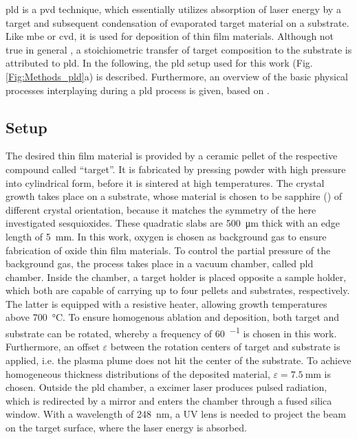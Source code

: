 \gls{pld} is a \gls{pvd} technique, which essentially utilizes absorption of laser energy by a target and subsequent condensation of evaporated target material on a substrate.
Like \gls{mbe} or \gls{cvd}, it is used for deposition of thin film materials.
Although not true in general \cite{lorenz2019}, a stoichiometric transfer of target composition to the substrate is attributed to \gls{pld}.
In the following, the \gls{pld} setup used for this work (Fig.\,\ref{Fig:Methods_pld}a) is described.
Furthermore, an overview of the basic physical processes interplaying during a \gls{pld} process is given, based on \textcite{lorenz2019}.

\subsection{Setup}\label{Sec:Methods_pld}
The desired thin film material is provided by a ceramic pellet of the respective compound called \enquote{target}.
It is fabricated by pressing powder with high pressure into cylindrical form, before it is sintered at high temperatures.
The crystal growth takes place on a substrate, whose material is chosen to be sapphire () of different crystal orientation, because it matches the symmetry of the here investigated sesquioxides.
These quadratic slabs are \qty{500}{\um} thick with an edge length of \qty{5}{\mm}.
%
In this work, oxygen is chosen as background gas to ensure fabrication of oxide thin film materials.
To control the partial pressure of the background gas, the process takes place in a vacuum chamber, called \gls{pld} chamber.
Inside the chamber, a target holder is placed opposite a sample holder, which both are capable of carrying up to four pellets and substrates, respectively.
The latter is equipped with a resistive heater, allowing growth temperatures above \qty{700}{\celsius}.
To ensure homogenous ablation and deposition, both target and substrate can be rotated, whereby a frequency of \qty{60}{\min^{-1}} is chosen in this work.
Furthermore, an offset $\varepsilon$ between the rotation centers of target and substrate is applied, i.e. the plasma plume does not hit the center of the substrate.
To achieve homogeneous thickness distributions of the deposited material, $\varepsilon=\qty{7.5}{\mm}$ is chosen.
Outside the \gls{pld} chamber, a  excimer laser produces pulsed radiation, which is redirected by a mirror and enters the chamber through a fused silica window.
With a wavelength of \qty{248}{\nm}, a UV lens is needed to project the beam on the target surface, where the laser energy is absorbed.
